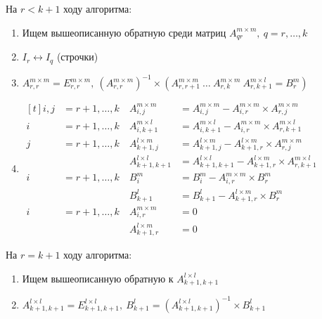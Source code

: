 \documentclass[12pt]{report}
\begin{document}
            На $r < k + 1$ ходу алгоритма: 
        \begin{enumerate}
            \item Ищем вышеописанную обратную среди матриц $A_{qr}^{m \times m},\ q = r, \ldots, k$ 
            \item $I_{r} \leftrightarrow I_{q}$ (строчки)
            \item $A_{r,r}^{m \times m} = E_{r,r}^{m \times m}, \ (A_{r,r}^{{m \times m}})^{-1} \times (A_{r,r+1}^{m \times m} \ \ldots \ A_{r,k}^{m \times m} \ A_{r,k+1}^{m \times l}
            = B_{r}^{m})$
            \item 
            $\begin{aligned}[t]
                i, j &= r+1, \ldots, k &\ A_{i, j}^{m \times m}   &= A_{i, j}^{m \times m} - A_{i,r}^{m \times m} \times A_{r,j}^{m \times m}        \\
                i   &= r+1, \ldots, k &\ A_{i,k+1}^{m \times l}   &= A_{i,k+1}^{m \times l} - A_{i,r}^{m \times m} \times A_{r,k+1}^{m \times l}     \\
                j   &= r+1, \ldots, k &\ A_{k+1,j}^{l \times m}   &= A_{k+1,j}^{l \times m} - A_{k+1,r}^{l \times m} \times A_{r,j}^{m \times m}     \\
                    &                 &\ A_{k+1,k+1}^{l \times l} &= A_{k+1,k+1}^{l \times l} - A_{k+1,r}^{l \times m} \times A_{r,k+1}^{m \times l} \\
                i   &= r+1, \ldots, k &\ B_{i}^{m}                &= B_{i}^{m} - A_{i,r}^{m \times m} \times B_{r}^{m} \\
                    &                 &\ B_{k+1}^{l}              &= B_{k+1}^{l} - A_{k+1,r}^{l \times m} \times B_{r}^{m}\\                
                i   &= r+1, \ldots, k &\ A_{i,r}^{m \times m}     &= 0 \\
                    &                 &\ A_{k+1,r}^{l \times m}   &= 0 
            \end{aligned}$
        \end{enumerate}

            На $r = k + 1$ ходу алгоритма:
            \begin{enumerate}
                \item \addtocounter{enumi}{1} Ищем вышеописанную обратную к $A_{k+1,k+1}^{l \times l}$
                \item $A_{k+1,k+1}^{l \times l} = E_{k+1,k+1}^{l \times l}, \ B_{k+1}^{l} = (A_{k+1,k+1}^{l \times l})^{-1} \times B_{k+1}^{l} $
            \end{enumerate}
\end{document}
